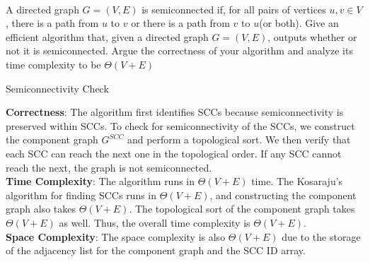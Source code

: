 \\
A directed graph $G= (V,E)$ is semiconnected if, for all pairs of vertices $u,v \in V$, there is a path from
$u$ to $v$ or there is a path from $v$ to $u$(or both). Give an efficient algorithm that, given a directed graph
$G= (V,E)$, outputs whether or not it is semiconnected. Argue the correctness of your algorithm and
analyze its time complexity to be $\Theta(V + E)$

\begin{customsolutionbox}
    \begin{algorithm}[H]
        \caption{Semiconnectivity Check}
    \end{algorithm}

    \textbf{Correctness}: The algorithm first identifies SCCs because semiconnectivity is preserved within SCCs. To check for semiconnectivity of 
    the SCCs, we construct the component graph $G^{SCC}$ and perform a topological sort. We then verify that each SCC can reach the next one in the 
    topological order. If any SCC cannot reach the next, the graph is not semiconnected. \\

    \textbf{Time Complexity}: The algorithm runs in $\Theta(V + E)$ time. The Kosaraju's algorithm for finding SCCs runs in $\Theta(V + E)$, and 
    constructing the component graph also takes $\Theta(V + E)$. The topological sort of the component graph takes $\Theta(V + E)$ as well. Thus, 
    the overall time complexity is $\Theta(V + E)$. \\
    
    \textbf{Space Complexity}: The space complexity is also $\Theta(V + E)$ due to the storage of the adjacency list for the component graph and the 
    SCC ID array.

\end{customsolutionbox}
